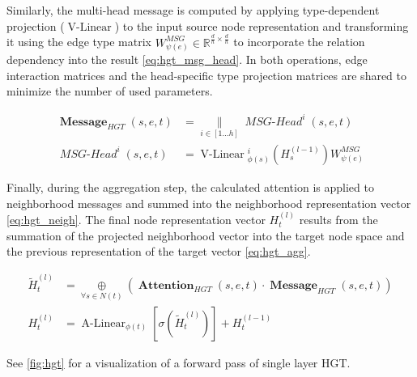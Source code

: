 \begin{secDefinition}
Similarly, the multi-head message is computed by applying type-dependent projection ($\operatorname{V-Linear}$) to the input source node representation and transforming it using the edge type matrix $W_{\psi(e)}^{MSG} \in \mathbb{R}^{\frac{d}{h} \times \frac{d}{h}}$ to incorporate the relation dependency into the result \cref{eq:hgt_msg_head}. 
In both operations, edge interaction matrices and the head-specific type projection matrices are shared to minimize the number of used parameters.  

\begin{align}
    \operatorname{\textbf{Message}}_{HGT}(s, e, t) &=\underset{i \in[1 \ldots h]}{\|} \operatorname{\textit{MSG-Head}}^{i}(s, e, t) \label{eq:hgt_msg} \\
        \operatorname{\mathit{MSG-Head}}^{i}(s, e, t) &=\operatorname{V-Linear}{ }_{\phi(s)}^{i}\left(H^{(l-1)}_s\right) W_{\psi(e)}^{MSG} \label{eq:hgt_msg_head}
\end{align}

Finally, during the aggregation step, the calculated attention is applied to neighborhood messages and summed into the neighborhood representation vector \cref{eq:hgt_neigh}.
The final node representation vector $H^{(l)}_t$ results from the summation of the projected neighborhood vector into the target node space and the previous representation of the target vector \cref{eq:hgt_agg}.

\begin{align}
    \widetilde{H}^{(l)}_t &=\underset{\forall s \in N(t)}{\oplus}\left(\operatorname { \textbf{Attention} }_{HGT}(s, e, t) \cdot \operatorname{\textbf{Message}}_{HGT}(s, e, t)\right) \label{eq:hgt_neigh} \\
    H^{(l)}_t &=\operatorname{A-Linear}_{\phi(t)}\left[\sigma\left(\widetilde{H}^{(l)}_t\right)\right]+H^{(l-1)}_t \label{eq:hgt_agg}
\end{align}

See \cref{fig:hgt} for a visualization of a forward pass of single layer HGT. 

\end{secDefinition}


